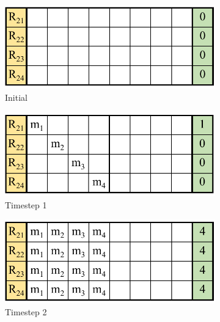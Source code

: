 \begin{figure}[t]
    \centering
    \begin{subfigure}[b]{0.32\columnwidth}
         \centering
         \includegraphics[width=\textwidth]{cack1.pdf}
         \caption{Initial}
         \label{sfig:initial}
     \end{subfigure}
     \begin{subfigure}[b]{0.32\columnwidth}
         \centering
         \includegraphics[width=\textwidth]{cack2.pdf}
         \caption{Timestep 1}
         \label{sfig:first-set}
     \end{subfigure}
     \begin{subfigure}[b]{0.32\columnwidth}
         \centering
         \includegraphics[width=\textwidth]{cack3.pdf}
         \caption{Timestep 2}
         \label{sfig:first-broadcast}
     \end{subfigure}
     \begin{subfigure}[b]{0.32\columnwidth}

\end{subfigure}
\end{figure}
